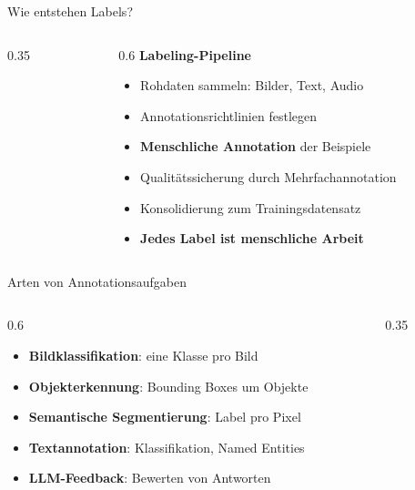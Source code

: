 \begin{frame}{Wie entstehen Labels?}
\begin{columns}
\begin{column}{0.35\linewidth}
\centering
{}
\end{column}
\begin{column}{0.6\linewidth}
\textbf{Labeling-Pipeline}
\begin{itemize}
  \item Rohdaten sammeln: Bilder, Text, Audio
  \item Annotationsrichtlinien festlegen
  \item \textbf{Menschliche Annotation} der Beispiele
  \item Qualitätssicherung durch Mehrfachannotation
  \item Konsolidierung zum Trainingsdatensatz
  \item[$\Rightarrow$] \textbf{Jedes Label ist menschliche Arbeit} 
\end{itemize}
\end{column}
\end{columns}
\end{frame}

\begin{frame}{Arten von Annotationsaufgaben}
\begin{columns}
\begin{column}{0.6\linewidth}
\begin{itemize}
  \item \textbf{Bildklassifikation}: eine Klasse pro Bild
  \item \textbf{Objekterkennung}: Bounding Boxes um Objekte
  \item \textbf{Semantische Segmentierung}: Label pro Pixel
  \item \textbf{Textannotation}: Klassifikation, Named Entities
  \item \textbf{LLM-Feedback}: Bewerten von Antworten
\end{itemize}
\end{column}
\begin{column}{0.35\linewidth}
\centering
{}
\end{column}
\end{columns}
\end{frame}

